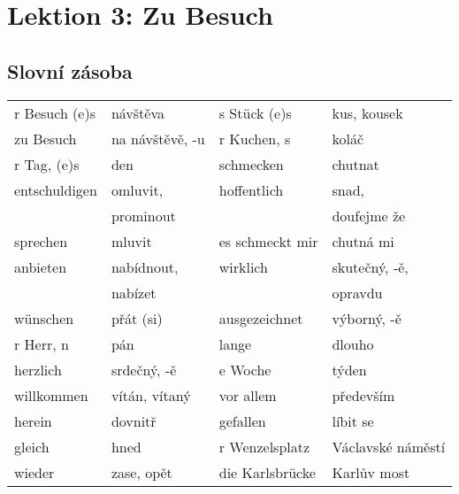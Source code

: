 \chapter{Lektion 3: Zu Besuch}\label{NJ:chap_N1_L3}

  \section*{Slovní zásoba}
    \begin{table}[h] %
      \begin{tabular}{llll}  
        \hline 
          r Besuch (e)s &  návštěva        & s Stück (e)s        & kus, kousek           \\
          zu Besuch     & na návštěvě, -u  & r Kuchen, s         & koláč                 \\
          r Tag, (e)s   & den              & schmecken           & chutnat               \\
          entschuldigen & omluvit,         & hoffentlich         & snad,                 \\
                        & prominout        &                     & doufejme že           \\
          sprechen      & mluvit           & es schmeckt mir     & chutná mi             \\
          anbieten      & nabídnout,       & wirklich            & skutečný, -ě,         \\
                        & nabízet          &                     & opravdu               \\
          wünschen      & přát (si)        & ausgezeichnet       & výborný, -ě           \\
          r Herr, n     & pán              & lange               & dlouho                \\
          herzlich      & srdečný, -ě      & e Woche             & týden                 \\
          willkommen    & vítán, vítaný    & vor allem           & především             \\
          herein        & dovnitř          & gefallen            & líbit se              \\
          gleich        & hned             & r Wenzelsplatz      & Václavské náměstí     \\
          wieder        & zase, opět       & die Karlsbrücke     & Karlův most           \\

\end{tabular}
\end{table}
